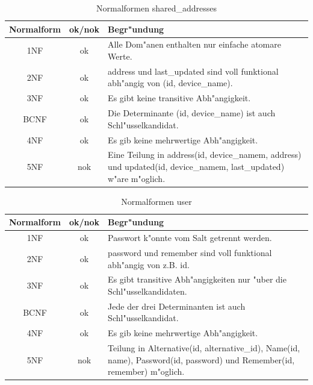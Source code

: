 \begin{table}[h]
    \centering
    \begin{tabular}{c|c|l}
        \textbf{Normalform} & \textbf{ok/nok} & \textbf{Begr{"u}ndung} \\
        \hline
        1NF & ok & \parbox{10cm}{Alle Dom{"a}nen enthalten nur einfache atomare Werte.} \\
        \hline
        2NF & ok & \parbox{10cm}{address und last\_updated sind voll funktional abh{"a}ngig von (id, device\_name).} \\
        \hline
        3NF & ok & \parbox{10cm}{Es gibt keine transitive Abh{"a}ngigkeit.} \\
        \hline
        BCNF & ok & \parbox{10cm}{Die Determinante (id, device\_name) ist auch Schl{"u}sselkandidat.} \\
        \hline
        4NF & ok & \parbox{10cm}{Es gib keine mehrwertige Abh{"a}ngigkeit.} \\
        \hline
        5NF & nok & \parbox{10cm}{Eine Teilung in address(id, device\_namem, address) und updated(id, device\_namem, last\_updated) w{"a}re m{"o}glich.} \\
    \end{tabular}
    \caption{Normalformen shared\_addresses}
    \label{tab: nf-addr}
\end{table}


\begin{table}[h]
    \centering
    \begin{tabular}{c|c|l}
        \textbf{Normalform} & \textbf{ok/nok} & \textbf{Begr{"u}ndung} \\
        \hline
        1NF & ok & \parbox{10cm}{Passwort k{"o}nnte vom Salt getrennt werden.} \\
        \hline
        2NF & ok & \parbox{10cm}{password und remember sind voll funktional abh{"a}ngig von z.B. id.} \\
        \hline
        3NF & ok & \parbox{10cm}{Es gibt transitive Abh{"a}ngigkeiten nur {"u}ber die Schl{"u}sselkandidaten.} \\
        \hline
        BCNF & ok & \parbox{10cm}{Jede der drei Determinanten ist auch Schl{"u}sselkandidat.} \\
        \hline
        4NF & ok & \parbox{10cm}{Es gib keine mehrwertige Abh{"a}ngigkeit.} \\
        \hline
        5NF & nok & \parbox{10cm}{Teilung in Alternative(id, alternative\_id), Name(id, name), Password(id, password) und Remember(id, remember) m{"o}glich.} \\
    \end{tabular}
    \caption{ Normalformen user}
    \label{tab: nf-user}
\end{table}
